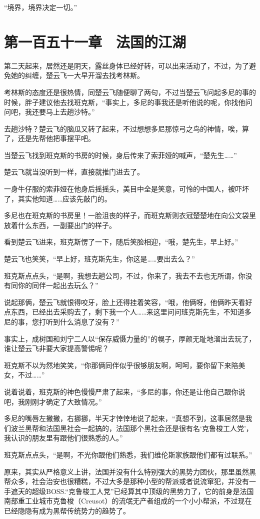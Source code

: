 “境界，境界决定一切。”

\section{第一百五十一章　法国的江湖}

第二天起来，居然还是阴天，露丝身体已经好转，可以出来活动了，不过，为了避免她的纠缠，楚云飞一大早开溜去找考林斯。

考林斯的态度还是很热情，同楚云飞随便聊了两句，不过当楚云飞问起多尼的事的时候，胖子建议他去找班克斯，“事实上，多尼的事我还是听他说的呢，你找他问问吧，我还要马上去趟沙特。”

去趟沙特？楚云飞的脑瓜又转了起来，不过想想多尼那惊弓之鸟的神情，唉，算了，还是先帮他把事摆平吧。

当楚云飞找到班克斯的书房的时候，身后传来了索菲娅的喊声，“楚先生……”

楚云飞就当没听到一样，直接就推门进去了。

一身牛仔服的索菲娅在他身后摇摇头，美目中全是笑意，可怜的中国人，被吓坏了，其实他知道……应该先敲门的。

多尼也在班克斯的书房里！一脸沮丧的样子，而班克斯则衣冠楚楚地在向公文袋里放着什么东西，一副要出门的样子。

看到楚云飞进来，班克斯愣了一下，随后笑脸相迎，“哦，楚先生，早上好。”

楚云飞也笑笑，“早上好，班克斯先生，你这是……要出去么？”

班克斯点点头，“是啊，我想去趟公司，不过，你来了，我去不去也无所谓，你没有同你的同伴一起出去玩么？”

说起那俩，楚云飞就恨得咬牙，脸上还得挂着笑容，“哦，他俩呀，他俩昨天看好点东西，已经出去采购去了，剩下我一个人……来这里问问班克斯先生，不知道多尼的事，您打听到什么消息了没有？”

事实上，成树国和刘宁二人以“保存威慑力量的”的幌子，厚颜无耻地溜出去玩了，谁让楚云飞非要大家提高警惕呢？

班克斯不以为然地笑笑，“你那俩同伴似乎很够朋友啊，呵呵，要你留下来陪美女，不过……”

说着说着，班克斯的神色慢慢严肃了起来，“多尼的事，你还是让他自己跟你说吧，我刚刚才确定了大致情况。”

多尼的嘴唇左撇撇，右挪挪，半天才悻悻地说了起来，“真想不到，这事居然是我们波兰黑帮和法国黑社会一起搞的，法国那个黑社会还是很有名‘克鲁梭工人党’，我认识的朋友里有跟他们很熟悉的人。”

班克斯点点头，“是啊，不光你跟他们熟悉，我们维伦斯家族跟他们都有过联系。”

原来，其实从严格意义上讲，法国并没有什么特别强大的黑势力团伙，那里虽然黑帮众多，社会治安也很糟糕，不过大多是那种小型的帮派或者说流窜犯，并没有一手遮天的超级BOSS.“克鲁梭工人党”已经算其中顶级的黑势力了，它的前身是法国南部重工业城市克鲁梭（Creusot）的流氓无产者组成的一个小小帮派，不过现在已经隐隐有成为黑帮传统势力的趋势了。

